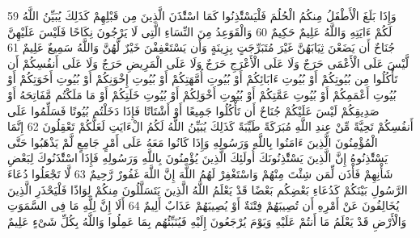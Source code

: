 \documentclass[20pt,a4paper]{article}
\begin{document}
{\tiny\colorbox{cl_aya}{59}} وَإِذَا بَلَغَ الْأَطْفَلُ مِنكُمُ الْحُلُمَ فَلْيَسْتَْٔذِنُوا كَمَا اسْتَْٔذَنَ الَّذِينَ مِن قَبْلِهِمْ كَذَلِكَ يُبَيِّنُ اللَّهُ لَكُمْ ءَايَتِهِ وَاللَّهُ عَلِيمٌ حَكِيمٌ
{\tiny\colorbox{cl_aya}{60}} وَالْقَوَعِدُ مِنَ النِّسَاءِ الَّتِى لَا يَرْجُونَ نِكَاحًا فَلَيْسَ عَلَيْهِنَّ جُنَاحٌ أَن يَضَعْنَ ثِيَابَهُنَّ غَيْرَ مُتَبَرِّجَتٍ بِزِينَةٍ وَأَن يَسْتَعْفِفْنَ خَيْرٌ لَّهُنَّ وَاللَّهُ سَمِيعٌ عَلِيمٌ
{\tiny\colorbox{cl_aya}{61}} لَّيْسَ عَلَى الْأَعْمَى حَرَجٌ وَلَا عَلَى الْأَعْرَجِ حَرَجٌ وَلَا عَلَى الْمَرِيضِ حَرَجٌ وَلَا عَلَى أَنفُسِكُمْ أَن تَأْكُلُوا مِن بُيُوتِكُمْ أَوْ بُيُوتِ ءَابَائِكُمْ أَوْ بُيُوتِ أُمَّهَتِكُمْ أَوْ بُيُوتِ إِخْوَنِكُمْ أَوْ بُيُوتِ أَخَوَتِكُمْ أَوْ بُيُوتِ أَعْمَمِكُمْ أَوْ بُيُوتِ عَمَّتِكُمْ أَوْ بُيُوتِ أَخْوَلِكُمْ أَوْ بُيُوتِ خَلَتِكُمْ أَوْ مَا مَلَكْتُم مَّفَاتِحَهُ أَوْ صَدِيقِكُمْ لَيْسَ عَلَيْكُمْ جُنَاحٌ أَن تَأْكُلُوا جَمِيعًا أَوْ أَشْتَاتًا فَإِذَا دَخَلْتُم بُيُوتًا فَسَلِّمُوا عَلَى أَنفُسِكُمْ تَحِيَّةً مِّنْ عِندِ اللَّهِ مُبَرَكَةً طَيِّبَةً كَذَلِكَ يُبَيِّنُ اللَّهُ لَكُمُ الْءَايَتِ لَعَلَّكُمْ تَعْقِلُونَ
{\tiny\colorbox{cl_aya}{62}} إِنَّمَا الْمُؤْمِنُونَ الَّذِينَ ءَامَنُوا بِاللَّهِ وَرَسُولِهِ وَإِذَا كَانُوا مَعَهُ عَلَى أَمْرٍ جَامِعٍ لَّمْ يَذْهَبُوا حَتَّى يَسْتَْٔذِنُوهُ إِنَّ الَّذِينَ يَسْتَْٔذِنُونَكَ أُولَئِكَ الَّذِينَ يُؤْمِنُونَ بِاللَّهِ وَرَسُولِهِ فَإِذَا اسْتَْٔذَنُوكَ لِبَعْضِ شَأْنِهِمْ فَأْذَن لِّمَن شِئْتَ مِنْهُمْ وَاسْتَغْفِرْ لَهُمُ اللَّهَ إِنَّ اللَّهَ غَفُورٌ رَّحِيمٌ
{\tiny\colorbox{cl_aya}{63}} لَّا تَجْعَلُوا دُعَاءَ الرَّسُولِ بَيْنَكُمْ كَدُعَاءِ بَعْضِكُم بَعْضًا قَدْ يَعْلَمُ اللَّهُ الَّذِينَ يَتَسَلَّلُونَ مِنكُمْ لِوَاذًا فَلْيَحْذَرِ الَّذِينَ يُخَالِفُونَ عَنْ أَمْرِهِ أَن تُصِيبَهُمْ فِتْنَةٌ أَوْ يُصِيبَهُمْ عَذَابٌ أَلِيمٌ
{\tiny\colorbox{cl_aya}{64}} أَلَا إِنَّ لِلَّهِ مَا فِى السَّمَوَتِ وَالْأَرْضِ قَدْ يَعْلَمُ مَا أَنتُمْ عَلَيْهِ وَيَوْمَ يُرْجَعُونَ إِلَيْهِ فَيُنَبِّئُهُم بِمَا عَمِلُوا وَاللَّهُ بِكُلِّ شَىْءٍ عَلِيمٌ
\end{document}

